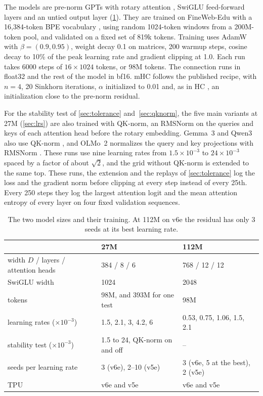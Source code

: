 \documentclass[11pt, a4paper]{article}
\newcommand{\lr}[1]{\ensuremath{#1 \times 10^{-3}}}
\begin{document}
The models are pre-norm GPTs \citep{radford2019gpt2} with rotary attention \citep{su2021roformer}, SwiGLU feed-forward layers \citep{shazeer2020glu} and an untied output layer (\cref{tab:setup}). They
are trained on FineWeb-Edu \citep{penedo2024fineweb} with a 16,384-token BPE vocabulary \citep{sennrich2016bpe}, using random 1024-token windows from a 200M-token pool, and validated
on a fixed set of 819k tokens. Training uses AdamW \citep{loshchilov2019adamw} with $\beta = (0.9, 0.95)$, weight decay 0.1 on matrices, 200 warmup steps,
cosine decay to 10\% of the peak learning rate and gradient clipping at 1.0. Each run takes 6000 steps of $16 \times 1024$ tokens,
or 98M tokens. The connection runs in float32 and the rest of the model in bf16. mHC follows the published recipe, with
$n = 4$, 20 Sinkhorn iterations, $\alpha$ initialized to 0.01 and, as in HC \citep{zhu2024hyperconnections}, an initialization close to the pre-norm
residual.

For the stability test of \cref{sec:tolerance} and~\cref{sec:qknorm}, the five main variants at 27M (\cref{sec:lrs}) are also trained with QK-norm,
an RMSNorm \citep{zhang2019rmsnorm} on the queries and keys of each attention head before the rotary embedding. Gemma~3 and Qwen3 also use QK-norm
\citep{gemma2025gemma3, yang2025qwen3}, and OLMo~2 normalizes the query and key projections with RMSNorm \citep{olmo2024olmo2}. These runs use nine learning rates from \lr{1.5} to \lr{24} spaced by a factor of about $\sqrt{2}$, and the
grid without QK-norm is extended to the same top. These runs, the extension and the replays of \cref{sec:tolerance} log the loss and the gradient norm before clipping at every step instead of every 25th. Every 250
steps they log the largest attention logit and the mean attention entropy of every layer on four fixed validation sequences.

\begin{table}[ht]
  \centering
  \caption{The two model sizes and their training. At 112M on v6e the residual has only 3 seeds at its best learning rate.}
  \label{tab:setup}
  \small
  \begin{tabular}{lll}
    \toprule
    & 27M & 112M \\
    \midrule
    width $D$ / layers / attention heads & 384 / 8 / 6 & 768 / 12 / 12 \\
    SwiGLU width & 1024 & 2048 \\
    tokens & 98M, and 393M for one test & 98M \\
    learning rates ($\times 10^{-3}$) & 1.5, 2.1, 3, 4.2, 6 & 0.53, 0.75, 1.06, 1.5, 2.1 \\
    stability test ($\times 10^{-3}$) & 1.5 to 24, QK-norm on and off & -- \\
    seeds per learning rate & 3 (v6e), 2--10 (v5e) & 3 (v6e, 5 at the best), 2 (v5e) \\
    TPU & v6e and v5e & v6e and v5e \\
    \bottomrule
  \end{tabular}
\end{table}
\end{document}
